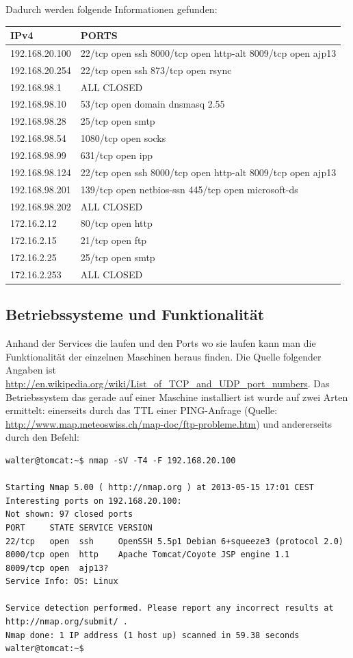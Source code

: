 \documentclass[12pt,a4paper,titlepage,oneside]{scrartcl}
\begin{document}
Dadurch werden folgende Informationen gefunden:

\begin{tabular}{ l | l}
\hline
IPv4	& PORTS\\ \hline
192.168.20.100 & 22/tcp open ssh 8000/tcp open http-alt 8009/tcp open ajp13\\ \hline
192.168.20.254 &	22/tcp open ssh 873/tcp open rsync\\ \hline
192.168.98.1 & ALL CLOSED\\ \hline
192.168.98.10 & 53/tcp open domain dnsmasq 2.55\\ \hline
192.168.98.28 & 25/tcp open smtp\\ \hline
192.168.98.54 & 1080/tcp open socks\\ \hline
192.168.98.99 & 631/tcp open ipp\\ \hline
192.168.98.124 &	22/tcp open ssh 8000/tcp open http-alt 8009/tcp open ajp13 \\ \hline
192.168.98.201 &	139/tcp open netbios-ssn 445/tcp open microsoft-ds\\ \hline
192.168.98.202 &	ALL CLOSED\\ \hline
172.16.2.12 &	80/tcp open http\\ \hline
172.16.2.15 &	21/tcp open ftp\\ \hline
172.16.2.25 &	25/tcp open smtp\\ \hline
172.16.2.253 &	ALL CLOSED \\ \hline
\end{tabular}

\newpage

\subsection{Betriebssysteme und Funktionalität}
\noindent
Anhand der Services die laufen und den Ports wo sie laufen kann man die Funktionalität der einzelnen Maschinen heraus finden. Die Quelle folgender Angaben ist \url{http://en.wikipedia.org/wiki/List_of_TCP_and_UDP_port_numbers}. Das Betriebssystem das gerade auf einer Maschine installiert ist wurde auf zwei Arten ermittelt: einerseits durch das TTL einer PING-Anfrage (Quelle: \url{http://www.map.meteoswiss.ch/map-doc/ftp-probleme.htm}) und andererseits durch den Befehl:

\begin{lstlisting}[caption=nmap OS Connections,style=simple]
walter@tomcat:~$ nmap -sV -T4 -F 192.168.20.100

Starting Nmap 5.00 ( http://nmap.org ) at 2013-05-15 17:01 CEST
Interesting ports on 192.168.20.100:
Not shown: 97 closed ports
PORT     STATE SERVICE VERSION
22/tcp   open  ssh     OpenSSH 5.5p1 Debian 6+squeeze3 (protocol 2.0)
8000/tcp open  http    Apache Tomcat/Coyote JSP engine 1.1
8009/tcp open  ajp13?
Service Info: OS: Linux

Service detection performed. Please report any incorrect results at http://nmap.org/submit/ .
Nmap done: 1 IP address (1 host up) scanned in 59.38 seconds
walter@tomcat:~$ 
\end{lstlisting}
\end{document}
